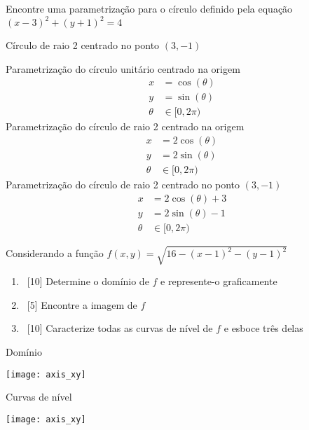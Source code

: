 \documentclass[a4paper,12pt,fleqn]{article}
\begin{document}

Encontre uma parametrização para o círculo definido pela equação
\( (x-3)^2 + (y+1)^2 = 4\)
\clearpagequestiononly

\begin{answer}
  Círculo de raio 2 centrado no ponto \((3, -1)\)

  Parametrização do círculo unitário centrado na origem
  \begin{align*}
    x      & = \cos(\theta) \\
    y      & = \sin(\theta) \\
    \theta & \in [0, 2\pi)
  \end{align*}
  Parametrização do círculo de raio 2 centrado na origem
  \begin{align*}
    x      & = 2\cos(\theta) \\
    y      & = 2\sin(\theta) \\
    \theta & \in [0, 2\pi)
  \end{align*}
  Parametrização do círculo de raio 2 centrado no ponto \((3, -1)\)
  \begin{align*}
  x      & = 2\cos(\theta) + 3 \\
  y      & = 2\sin(\theta) - 1 \\
  \theta & \in [0, 2\pi)
  \end{align*}
\end{answer}

Considerando a função
\(
  f(x,y) = \sqrt{16 - (x-1)^2 - (y-1)^2}
\)
\begin{enumerate}[label=(\alph*)]
  \item \ [10] Determine o domínio de $f$ e represente-o graficamente
  \item \ [5] Encontre a imagem de $f$
  \item \ [10] Caracterize todas as curvas de nível de $f$ e esboce três delas
\end{enumerate}
\begin{questiononly}
\begin{multicols}{2}
  Domínio
  \vspace{-0.8\baselineskip}
  \begin{center}
    \texttt{[image: axis\_xy]}
  \end{center}
  Curvas de nível
  \vspace{-0.8\baselineskip}
  \begin{center}
    \texttt{[image: axis\_xy]}
  \end{center}
\end{multicols}
\end{questiononly}
\clearpagequestiononly
\end{document}
